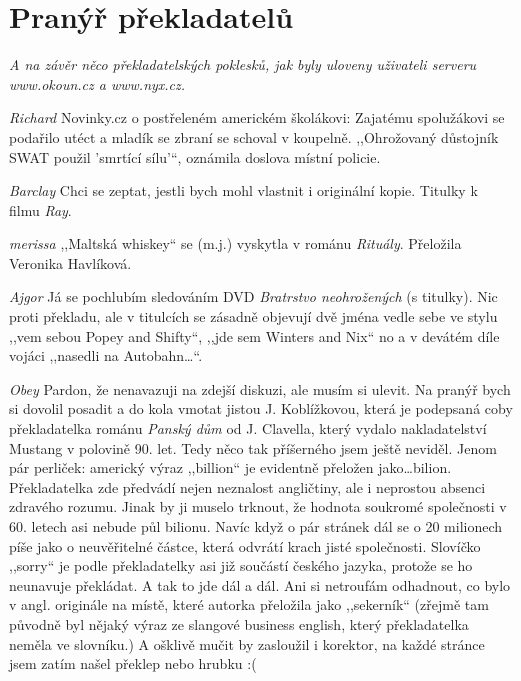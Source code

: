 \section{Pranýř překladatelů}

\noindent
\textit{A na závěr něco překladatelských poklesků, jak byly uloveny uživateli serveru www.okoun.cz a www.nyx.cz.}

\medskip

\noindent
\textit{Richard} Novinky.cz o postřeleném americkém školákovi: Zajatému spolužákovi se podařilo utéct a mladík se zbraní se schoval v koupelně. ,,Ohrožovaný důstojník SWAT použil 'smrtící sílu'``, oznámila doslova místní policie.

\medskip

\noindent
\textit{Barclay} Chci se zeptat, jestli bych mohl vlastnit i originální kopie. Titulky k filmu \textit{Ray}.

\medskip

\noindent
\textit{merissa} ,,Maltská whiskey`` se (m.j.) vyskytla v románu \textit{Rituály}. Přeložila Veronika Havlíková.

\medskip

\noindent
\textit{Ajgor} Já se pochlubím sledováním DVD \textit{Bratrstvo neohrožených} (s titulky). Nic proti překladu, ale v titulcích se zásadně objevují dvě jména vedle sebe ve stylu ,,vem sebou Popey and Shifty``, ,,jde sem Winters and Nix`` no a v devátém díle vojáci ,,nasedli na Autobahn\ldots``.

\medskip

\noindent
\textit{Obey} Pardon, že nenavazuji na zdejší diskuzi, ale musím si ulevit. Na pranýř bych si dovolil posadit a do kola vmotat jistou J. Koblížkovou, která je podepsaná coby překladatelka románu \textit{Panský dům} od J. Clavella, který vydalo nakladatelství Mustang v polovině 90. let. Tedy něco tak příšerného jsem ještě neviděl. Jenom pár perliček: americký výraz ,,billion`` je evidentně přeložen jako\ldots bilion. Překladatelka zde předvádí nejen neznalost angličtiny, ale i neprostou absenci zdravého rozumu. Jinak by ji muselo trknout, že hodnota soukromé společnosti v 60. letech asi nebude půl bilionu. Navíc když o pár stránek dál se o 20 milionech píše jako o neuvěřitelné částce, která odvrátí krach jisté společnosti. Slovíčko ,,sorry`` je podle překladatelky asi již součástí českého jazyka, protože se ho neunavuje překládat.
A tak to jde dál a dál. Ani si netroufám odhadnout, co bylo v angl. originále na místě, které autorka přeložila jako ,,sekerník`` (zřejmě tam původně byl nějaký výraz ze slangové business english, který překladatelka neměla ve slovníku.) A ošklivě mučit by zasloužil i korektor, na každé stránce jsem zatím našel překlep nebo hrubku :(

